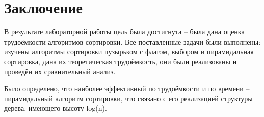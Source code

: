 \chapter*{Заключение}
\label{cha:conclusion}
В результате лабораторной работы цель была достигнута -- была дана оценка трудоёмкости алгоритмов сортировки. Все поставленные задачи были выполнены: изучены алгоритмы сортировки пузырьком с флагом, выбором и пирамидальная сортировка, дана их теоретическая трудоёмкость, они были реализованы и проведён их сравнительный анализ.
\par Было определено, что наиболее эффективный по трудоёмкости и по времени -- пирамидальный алгоритм сортировки, что связано с его реализацией структуры дерева, имеющего высоту log(n).